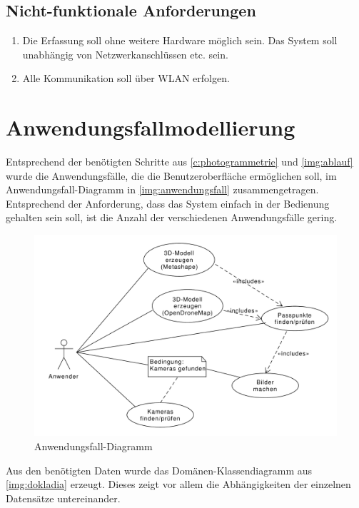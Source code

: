 \documentclass[./00PhotoBox.tex]{subfiles}
\begin{document}
\subsection{Nicht-funktionale Anforderungen}
\begin{enumerate}[label=N\arabic*]
  \item Die Erfassung soll ohne weitere Hardware möglich sein. Das System soll unabhängig von Netzwerkanschlüssen etc. sein.
  \item Alle Kommunikation soll über WLAN erfolgen.
\end{enumerate}

\section{Anwendungsfallmodellierung}
\label{sec:Anwendungsfallmodellierung}

Entsprechend der benötigten Schritte aus \autoref{c:photogrammetrie} und \autoref{img:ablauf} wurde die Anwendungsfälle, die die Benutzeroberfläche ermöglichen soll, im Anwendungsfall-Dia\-gramm in \autoref{img:anwendungsfall} zusammengetragen. Entsprechend der Anforderung, dass das System einfach in der Bedienung gehalten sein soll, ist die Anzahl der verschiedenen Anwendungsfälle gering.

\begin{figure}
  \centering
  \includegraphics[width=1\textwidth]{./img/uml/uml_usecases.pdf}
  \caption{Anwendungsfall-Diagramm} %
  \label{img:anwendungsfall} %
\end{figure}

Aus den benötigten Daten wurde das Domänen-Klassendiagramm aus \autoref{img:dokladia} erzeugt. Dieses zeigt vor allem die Abhängigkeiten der einzelnen Datensätze untereinander.
\end{document}
